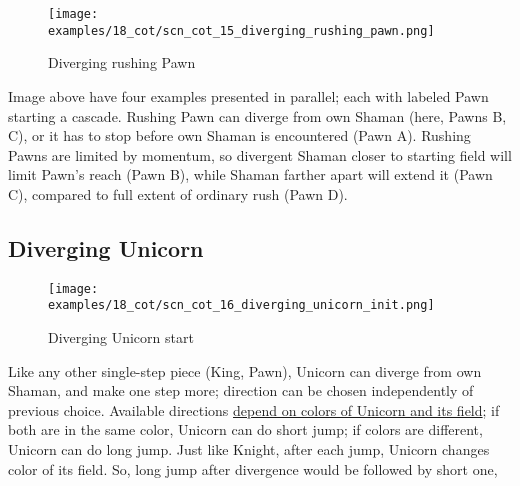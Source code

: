 \vspace*{-1.4\baselineskip}
\noindent
\begin{figure}[!h]
\texttt{[image: examples/18\_cot/scn\_cot\_15\_diverging\_rushing\_pawn.png]}
\vspace*{-1.3\baselineskip}
\caption{Diverging rushing Pawn}
\label{fig:scn_cot_15_diverging_rushing_pawn}
\end{figure}

\vspace*{-0.5\baselineskip}
Image above have four examples presented in parallel; each with labeled Pawn starting
a cascade. \newline
\indent
Rushing Pawn can diverge from own Shaman (here, Pawns B, C), or it has to stop before
own Shaman is encountered (Pawn A). Rushing Pawns are limited by momentum, so
divergent Shaman closer to starting field will limit Pawn's reach (Pawn B), while
Shaman farther apart will extend it (Pawn C), compared to full extent of ordinary
rush (Pawn D).

\clearpage %

\subsection*{Diverging Unicorn}
\label{sec:Conquest of Tlalocan/Divergence/Diverging Unicorn}

\vspace*{-1.4\baselineskip}
\noindent
\begin{figure}[!h]
\texttt{[image: examples/18\_cot/scn\_cot\_16\_diverging\_unicorn\_init.png]}
\vspace*{-1.3\baselineskip}
\caption{Diverging Unicorn start}
\label{fig:scn_cot_16_diverging_unicorn_init}
\end{figure}

\vspace*{-0.5\baselineskip}
Like any other single-step piece (King, Pawn), Unicorn can diverge from own Shaman,
and make one step more; direction can be chosen independently of previous choice.
Available directions
\hyperref[fig:scn_aoa_01_unicorn_same_color]{depend on colors of Unicorn and its field};
if both are in the same color, Unicorn can do short jump; if colors are different, Unicorn
can do long jump. Just like Knight, after each jump, Unicorn changes color of its field.
So, long jump after divergence would be followed by short one,

